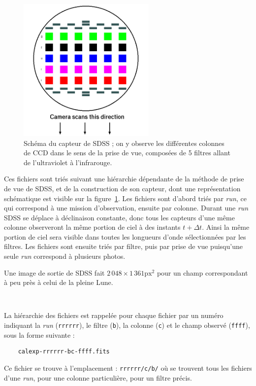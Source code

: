 \

	\begin{figure}[h]
		\centering
		\includegraphics[width=0.6\textwidth]{img/sdss-capteur.png}
		\caption[Schéma du capteur de SDSS]{Schéma du capteur de SDSS ; on y observe les différentes colonnes de CCD dans le sens de la prise de vue, composées de 5 filtres allant de l'ultraviolet à l'infrarouge.}
		\label{fig:sdss-capteur}
	\end{figure}

Ces fichiers sont triés suivant une hiérarchie dépendante de la méthode de prise de vue de SDSS, et de la construction de son capteur, dont une représentation schématique est visible sur la figure~\ref{fig:sdss-capteur}. Les fichiers sont d'abord triés par \emph{run}, ce qui correspond à une mission d'observation, ensuite par colonne. Durant une \emph{run} SDSS se déplace à déclinaison constante, donc tous les capteurs d'une même colonne observeront la même portion de ciel à des instants $t+\Delta t$. Ainsi la même portion de ciel sera visible dans toutes les longueurs d'onde sélectionnées par les filtres. Les fichiers sont ensuite triés par filtre, puis par prise de vue puisqu'une seule \emph{run} correspond à plusieurs photos.

Une image de sortie de SDSS fait $2\,048 \times 1\,361 \mbox{px}^2$ pour un champ correspondant à peu près à celui de la pleine Lune.

\

La hiérarchie des fichiers est rappelée pour chaque fichier par un numéro indiquant la \emph{run} (\texttt{rrrrrr}), le filtre (\texttt{b}), la colonne (\texttt{c}) et le champ observé (\texttt{ffff}), sous la forme suivante :
\begin{verbatim}
	calexp-rrrrrr-bc-ffff.fits
\end{verbatim}
Ce fichier se trouve à l'emplacement : \texttt{rrrrrr/c/b/} où se trouvent tous les fichiers d'une \emph{run}, pour une colonne particulière, pour un filtre précis.

